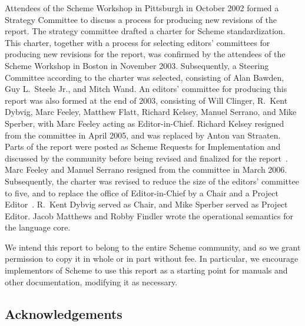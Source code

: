 Attendees of the Scheme Workshop in Pittsburgh in October 2002 formed
a Strategy Committee to discuss a process for producing new revisions
of the report.  The strategy committee drafted a charter for Scheme
standardization.  This charter, together with a process for selecting
editors' committees for producing new revisions for the report, was
confirmed by the attendees of the Scheme Workshop in Boston in
November 2003.  Subsequently, a Steering Committee according to the
charter was selected, consisting of Alan Bawden, Guy L.\ Steele Jr.,
and Mitch Wand.  An editors' committee for producing this report was
also formed at the end of 2003, consisting of Will Clinger,
R.\ Kent Dybvig, Marc Feeley, Matthew Flatt, Richard Kelsey, Manuel
Serrano, and Mike Sperber, with Marc Feeley acting as Editor-in-Chief.
Richard Kelsey resigned from the committee in April 2005, and was
replaced by Anton van Straaten.  
Parts of the report were posted as Scheme Requests for Implementation
and discussed by the community before being revised and finalized for
the report~\cite{srfi75,srfi76,srfi77,srfi83,srfi93}.
Marc Feeley and Manuel Serrano
resigned from the committee in March 2006.  Subsequently, the charter
was revised to reduce the size of the editors' committee to five, and
to replace the office of Editor-in-Chief by a Chair and a Project
Editor~\cite{SchemeCharter2006}.  R.\ Kent Dybvig served as Chair, and
Mike Sperber served as Project Editor.  Jacob Matthews and Robby
Findler wrote the operational semantics for the language core.

\medskip

We intend this report to belong to the entire Scheme community, and so
we grant permission to copy it in whole or in part without fee.  In
particular, we encourage implementors of Scheme to use this report as
a starting point for manuals and other documentation, modifying it as
necessary.




\subsection*{Acknowledgements}

